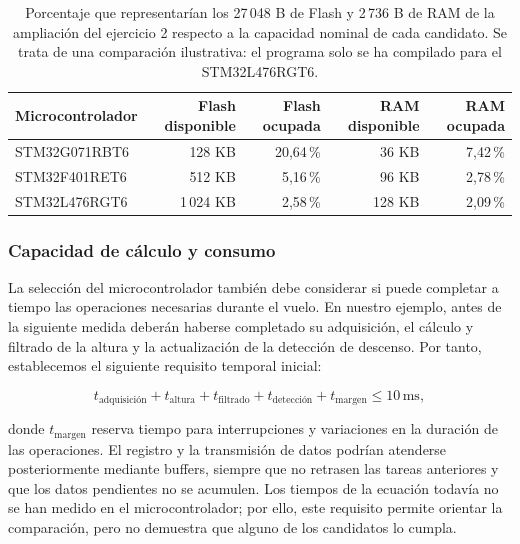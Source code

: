 \documentclass[11pt,a4paper]{article}
\begin{document}
\begin{table}[H]
    \centering
    \renewcommand{\arraystretch}{1.2}
    \begin{tabular}{lrrrr}
        \toprule
        Microcontrolador
        & Flash disponible & Flash ocupada
        & RAM disponible & RAM ocupada \\
        \midrule
        STM32G071RBT6 & 128 KB   & 20,64\,\% & 36 KB  & 7,42\,\% \\
        STM32F401RET6 & 512 KB   &  5,16\,\% & 96 KB  & 2,78\,\% \\
        STM32L476RGT6 & 1\,024 KB &  2,58\,\% & 128 KB & 2,09\,\% \\
        \bottomrule
    \end{tabular}
    \caption{Porcentaje que representarían los 27\,048 B de Flash y
    2\,736 B de RAM de la ampliación del ejercicio 2 respecto a la capacidad
    nominal de cada candidato. Se trata de una comparación ilustrativa:
    el programa solo se ha compilado para el STM32L476RGT6.}%
    \label{tab:comparacion_memoria_candidatos}
\end{table}

\subsubsection{Capacidad de cálculo y consumo}

La selección del microcontrolador también debe considerar si puede
completar a tiempo las operaciones necesarias durante el vuelo. En nuestro ejemplo, antes de la
siguiente medida deberán haberse completado su adquisición, el
cálculo y filtrado de la altura y la actualización de la detección
de descenso. Por tanto, establecemos el siguiente requisito temporal
inicial:

\begin{equation}
t_{\text{adquisición}}
+t_{\mathrm{altura}}
+t_{\mathrm{filtrado}}
+t_{\text{detección}}
+t_{\mathrm{margen}}
\leq 10\,\mathrm{ms},
\label{eq:presupuesto_temporal}
\end{equation}

donde $t_{\mathrm{margen}}$ reserva tiempo para interrupciones y
variaciones en la duración de las operaciones. El registro y la
transmisión de datos podrían atenderse posteriormente mediante
buffers, siempre que no retrasen las tareas anteriores y que los
datos pendientes no se acumulen. Los tiempos de la
ecuación todavía no se han medido en el microcontrolador; por ello,
este requisito permite orientar la comparación, pero no demuestra
que alguno de los candidatos lo cumpla.
\end{document}
